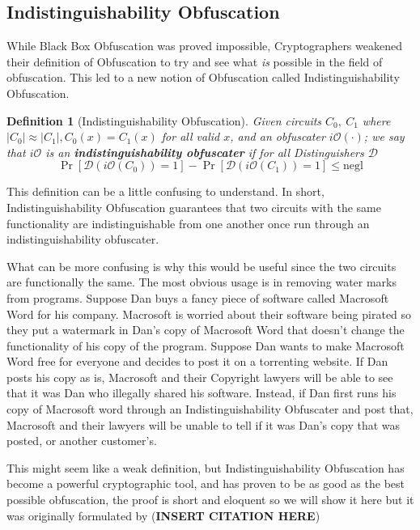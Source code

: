 \documentclass[12pt,twoside]{reedthesis}
\newtheorem{definition}{Definition}
\begin{document}
    \subsection{Indistinguishability Obfuscation}
    While Black Box Obfuscation was proved impossible, Cryptographers weakened their definition of Obfuscation to try and see what \textit{is} possible in the field of obfuscation. This led to a new notion of Obfuscation called Indistinguishability Obfuscation. 
    \newcommand{\iO}[0]{\textit{i}\mathcal{O}}
    
    
    \begin{definition}[Indistinguishability Obfuscation]
    Given circuits $C_0,\ C_1$ where $|C_0| \approx |C_1|, C_0(x) = C_1(x)$ for all valid $x$, and an obfuscater $\iO(\cdot)$; we say that $\iO$ is an \textbf{indistinguishability obfuscater} if for all Distinguishers $\mathcal{D}$
    $$\Pr[\mathcal{D}(\iO(C_0)) = 1] -\Pr[\mathcal{D}(\iO(C_1)) = 1] \leq \text{negl}$$
    \end{definition}
    
    \par This definition can be a little confusing to understand. In short, Indistinguishability Obfuscation guarantees that two circuits with the same functionality are indistinguishable from one another once run through an indistinguishability obfuscater. 
    \par What can be more confusing is why this would be useful since the two circuits are functionally the same. The most obvious usage is in removing water marks from programs. Suppose Dan buys a fancy piece of software called Macrosoft Word for his company. Macrosoft is worried about their software being pirated so they put a watermark in Dan's copy of Macrosoft Word that doesn't change the functionality of his copy of the program. Suppose Dan wants to make Macrosoft Word free for everyone and decides to post it on a torrenting website. If Dan posts his copy as is, Macrosoft and their Copyright lawyers will be able to see that it was Dan who illegally shared his software. Instead, if Dan first runs his copy of Macrosoft word through an Indistinguishability Obfuscater and post that, Macrosoft and their lawyers will be unable to tell if it was Dan's copy that was posted, or another customer's.
    \par This might seem like a weak definition, but Indistinguishability Obfuscation has become a powerful cryptographic tool, and has proven to be as good as the best possible obfuscation, the proof is short and eloquent so we will show it here but it was originally formulated by (\textbf{INSERT CITATION HERE})
    
\end{document}
